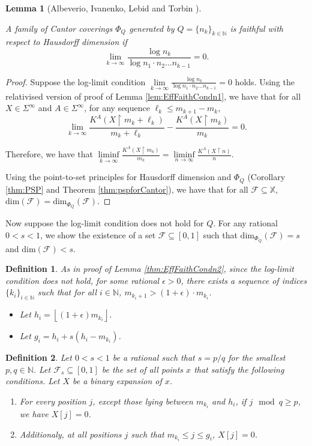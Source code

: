 \documentclass[11pt]{article}
\newtheorem{lemma}{Lemma}
\newtheorem{definition}{Definition}
\newcommand{\floor}[1]{ \left\lfloor #1 \right\rfloor }
\newcommand{\restr}{\upharpoonright}
\newcommand{\N}{\mathbb{N}}
\renewcommand{\dim}{{\mathrm{dim}}}
\newcommand{\F}{{\mathcal{F}}}
\newcommand{\X}{{\mathbb{X}}}
\renewcommand{\F}{\mathcal{F}}
\begin{document}
\begin{lemma}[Albeverio, Ivanenko, Lebid and Torbin  \cite{Albeverio2020}] \label{lem:AlbIvankio1}
	
	A family of  Cantor coverings $\Phi_Q$ generated by $Q = \{n_k\}_{k \in \N}$ is faithful with respect to Hausdorff dimension if 
	$$\lim\limits_{k\rightarrow \infty} \frac{\log n_k}{\log n_1 \cdot n_2
		\dots n_{k-1}} = 0.$$
\end{lemma}
\begin{proof}
	Suppose the log-limit condition $\lim\limits_{k\rightarrow \infty} \frac{\log n_k}{\log n_1 \cdot n_2
		\dots n_{k-1}} = 0$ holds. 
	Using the relativised version of proof of Lemma \ref{lem:EffFaithCondn1},  
	we have that for all $X \in \Sigma^\infty$ and $A \in \Sigma^\infty$, for any sequence  $\ell_k \leq m_{k+1} - m_k$, 
	$$\lim_{k \to \infty} \frac{K^A(X \restr m_{k} + \ell_k)}{m_{k} + \ell_k} - \frac{K^A(X \restr m_{k})}{m_{k}}  = 0.$$
	
	Therefore, we have that $\liminf\limits_{k \to \infty}{\frac{K^A(X \restr m_{k})}{m_{k}}} = \liminf\limits_{n \to \infty} \frac{K^A(X \restr n )}{n}$.	
	
	Using the point-to-set principles for Hausdorff dimension and $\Phi_Q$ (Corollary \ref{thm:PSP} and Theorem \ref{thm:pspforCantor}), we have that for all $\F \subseteq \X$, $\dim(\F) = \dim_{\Phi_Q}(\F)$.
	
	
\end{proof}

	Now suppose the log-limit condition  does not hold for $Q$. For any rational $0 < s < 1$, we show the existence of a set $\F \subseteq [0,1]$ such that $\dim_{\Phi_Q}(\F) = s$ and $\dim(\F) < s$.

\begin{definition}
As in proof of Lemma \ref{thm:EffFaithCondn2}, since the log-limit condition does not hold, for some rational $\epsilon > 0$, there exists a sequence of indices $\{k_i\}_{i \in \N}$ such that for all $i \in \N$, ${ m_{k_i+1}} > (1 + \epsilon) \cdot {m_{k_i}}$.
\begin{itemize}	
\item Let $h_i = \floor{(1 + \epsilon) m_{k_i}}$. 
\item Let $g_i = h_i + s (h_i - m_{k_i})$. 
\end{itemize}
\end{definition}


\begin{definition}
Let $0 < s < 1$ be a rational such that $s = p/q$ for the smallest $p,q \in \N$.	
Let $\F_s\subseteq[0,1]$ be the set of all points $x$ that satisfy the following conditions.  Let $X$ be a binary expansion of $x$. 
\begin{enumerate}
	\item For every position $j$, except those lying between $m_{k_i}$ and $h_i$, if $j \mod q  \geq p$, we have $X[j] = 0$.  
	\item Additionaly, at all positions $j$ such that  $m_{k_i} \leq j \leq g_i$, $X[j] = 0$.
\end{enumerate}
\end{definition}
\end{document}
